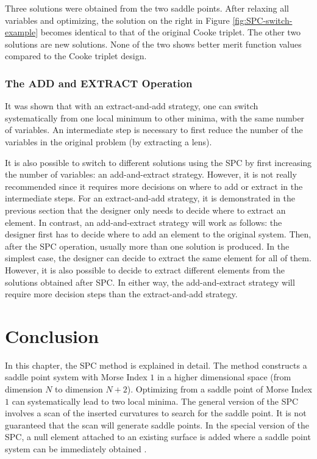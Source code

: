 Three solutions were obtained from the two saddle points. After relaxing all variables and optimizing, the solution on the right in Figure \ref{fig:SPC-switch-example} becomes identical to that of the original Cooke triplet. The other two solutions are new solutions. None of the two shows better merit function values compared to the Cooke triplet design. 


\subsubsection{The ADD and EXTRACT Operation }
It was shown that with an extract-and-add strategy, one can switch systematically from one local minimum to other minima, with the same number of variables. An intermediate step is necessary to first reduce the number of the variables in the original problem (by extracting a lens). 

It is also possible to switch to different solutions using the SPC by first increasing the number of variables: an add-and-extract strategy. However, it is not really recommended since it requires more decisions on where to add or extract in the intermediate steps. For an extract-and-add strategy, it is demonstrated in the previous section that the designer only needs to decide where to extract an element. In contrast, an add-and-extract strategy will work as follows: the designer first has to decide where to add an element to the original system. Then, after the SPC operation, usually more than one solution is produced. In the simplest case, the designer can decide to extract the same element for all of them. However, it is also possible to decide to extract different elements from the solutions obtained after SPC. In either way, the add-and-extract strategy will require more decision steps than the extract-and-add strategy.

\section{Conclusion}
In this chapter, the SPC method is explained in detail. The method constructs a saddle point system with Morse Index $1$ in a higher dimensional space (from dimension $N$ to dimension $N+2$). Optimizing from a saddle point of Morse Index $1$ can systematically lead to two local minima. The general version of the SPC involves a scan of the inserted curvatures to search for the saddle point. It is not guaranteed that the scan will generate saddle points. In the special version of the SPC, a null element attached to an existing surface is added where a saddle point system can be immediately obtained \cite{BociortSPCSexplained}. 

